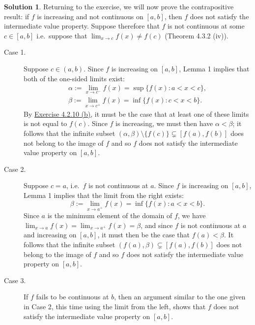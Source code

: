 \documentclass[12pt]{article}
\theoremstyle{definition}
\theoremstyle{exercise}
\theoremstyle{solution}
\newtheorem*{solution}{Solution}
\begin{document}
\begin{solution}
    Returning to the exercise, we will now prove the contrapositive result: if \( f \) is increasing and not continuous on \( [a, b] \), then \( f \) does not satisfy the intermediate value property. Suppose therefore that \( f \) is not continuous at some \( c \in [a, b] \) i.e.\ suppose that \( \lim_{x \to c} f(x) \neq f(c) \) (Theorem 4.3.2 (iv)).
    \begin{description}
        \item[Case 1.] Suppose \( c \in (a, b) \). Since \( f \) is increasing on \( [a, b] \), Lemma 1 implies that both of the one-sided limits exist:
        \begin{gather*}
            \alpha := \lim_{x \to c^-} f(x) = \sup \{ f(x) : a < x < c \}, \\[2mm]
            \beta := \lim_{x \to c^+} f(x) = \inf \{ f(x) : c < x < b \}.
        \end{gather*}
        By \href{https://lew98.github.io/Mathematics/UA_Section_4_2_Exercises.pdf}{Exercise 4.2.10 (b)}, it must be the case that at least one of these limits is not equal to \( f(c) \). Since \( f \) is increasing, we must then have \( \alpha < \beta \); it follows that the infinite subset \( (\alpha, \beta) \setminus \{ f(c) \} \subsetneq [f(a), f(b)] \) does not belong to the image of \( f \) and so \( f \) does not satisfy the intermediate value property on \( [a, b] \).

        \item[Case 2.] Suppose \( c = a \), i.e.\ \( f \) is not continuous at \( a \). Since \( f \) is increasing on \( [a, b] \), Lemma 1 implies that the limit from the right exists:
        \[
            \beta := \lim_{x \to a^+} f(x) = \inf \{ f(x) : a < x < b \}.
        \]
        Since \( a \) is the minimum element of the domain of \( f \), we have \( \lim_{x \to a} f(x) = \lim_{x \to a^+} f(x) = \beta \), and since \( f \) is not continuous at \( a \) and increasing on \( [a, b] \), it must then be the case that \( f(a) < \beta \). It follows that the infinite subset \( (f(a), \beta) \subsetneq [f(a), f(b)] \) does not belong to the image of \( f \) and so \( f \) does not satisfy the intermediate value property on \( [a, b] \).

        \item[Case 3.] If \( f \) fails to be continuous at \( b \), then an argument similar to the one given in Case 2, this time using the limit from the left, shows that \( f \) does not satisfy the intermediate value property on \( [a, b] \).
    \end{description}
\end{solution}
\end{document}
